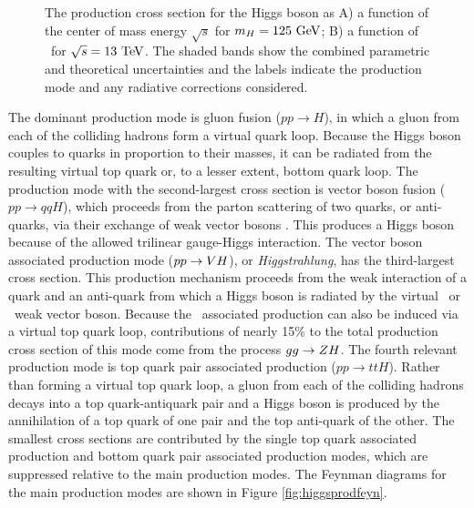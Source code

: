 \begin{figure}[htbp]
{  }
  \caption[Higgs Boson Production Cross Sections]{The production cross section for the Higgs boson as A) a function of the center of mass energy $\sqrt{s}$ for $m_{H} = 125\ \mathrm{GeV}$; B) a function of \massH\ for $\sqrt{s} = 13\ \mathrm{TeV}$. The shaded bands show the combined parametric and theoretical uncertainties and the labels indicate the production mode and any radiative corrections considered.\cite{CERNYR4}}
  \label{fig:higgsprodxsec}
\end{figure}

The dominant production mode is gluon fusion ($pp \rightarrow H$), in which a gluon from each of the colliding hadrons form a virtual quark loop. Because the Higgs boson couples to quarks in proportion to their masses, it can be radiated from the resulting virtual top quark or, to a lesser extent, bottom quark loop. The production mode with the second-largest cross section is vector boson fusion ($pp \rightarrow qqH$), which proceeds from the parton scattering of two quarks, or anti-quarks, via their exchange of weak vector bosons \bosV. This produces a Higgs boson because of the allowed trilinear gauge-Higgs interaction. The vector boson associated production mode ($pp \rightarrow VH$), or \textit{Higgstrahlung}, has the third-largest cross section. This production mechanism proceeds from the weak interaction of a quark and an anti-quark from which a Higgs boson is radiated by the virtual \bosW\ or \bosZ\ weak vector boson. Because the \bosZ\ associated production can also be induced via a virtual top quark loop, contributions of nearly 15\% to the total production cross section of this mode come from the process $gg \rightarrow ZH$. The fourth relevant production mode is top quark pair associated production ($pp \rightarrow ttH$). Rather than forming a virtual top quark loop, a gluon from each of the colliding hadrons decays into a top quark-antiquark pair and a Higgs boson is produced by the annihilation of a top quark of one pair and the top anti-quark of the other. The smallest cross sections are contributed by the single top quark associated production and bottom quark pair associated production modes, which are suppressed relative to the main production modes. The Feynman diagrams for the main production modes are shown in Figure \ref{fig:higgsprodfeyn}.

